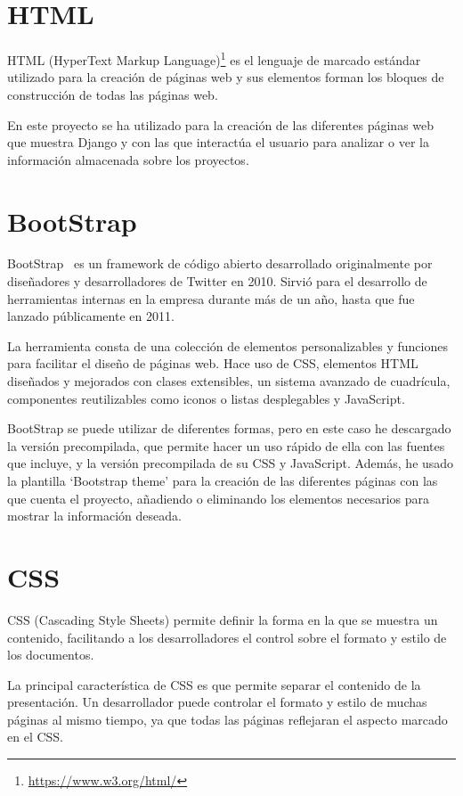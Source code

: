 \documentclass[a4paper, 12pt]{book}
\begin{document}
\section{HTML} 
\label{sec:seccion6}
HTML (HyperText Markup Language)\footnote{\url{https://www.w3.org/html/}} es el lenguaje de marcado estándar utilizado para la creación de páginas web y sus elementos forman los bloques de construcción de todas las páginas web.~\cite{robson:_html_css}

En este proyecto se ha utilizado para la creación de las diferentes páginas web que muestra Django y con las que interactúa el usuario para analizar o ver la información almacenada sobre los proyectos.

\section{BootStrap} 
\label{sec:seccion7}
BootStrap~\cite{bootstrap:_bootstrap} es un framework de código abierto desarrollado originalmente por diseñadores y desarrolladores de Twitter en 2010. Sirvió para el desarrollo de herramientas internas en la empresa durante más de un año, hasta que fue lanzado públicamente en 2011.

La herramienta consta de una colección de elementos personalizables y funciones para facilitar el diseño de páginas web. Hace uso de CSS, elementos HTML diseñados y mejorados con clases extensibles, un sistema avanzado de cuadrícula, componentes reutilizables como iconos o listas desplegables y JavaScript.

BootStrap se puede utilizar de diferentes formas, pero en este caso he descargado la versión precompilada, que permite hacer un uso rápido de ella con las fuentes que incluye, y la versión precompilada de su CSS y JavaScript. Además, he usado la plantilla `Bootstrap theme' para la creación de las diferentes páginas con las que cuenta el proyecto, añadiendo o eliminando los elementos necesarios para mostrar la información deseada.

\section{CSS} 
\label{sec:seccion8}
CSS (Cascading Style Sheets) permite definir la forma en la que se muestra un contenido, facilitando a los desarrolladores el control sobre el formato y estilo de los documentos.~\cite{robson:_html_css}

La principal característica de CSS es que permite separar el contenido de la presentación. Un desarrollador puede controlar el formato y estilo de muchas páginas al mismo tiempo, ya que todas las páginas reflejaran el aspecto marcado en el CSS.
    
\end{document}
